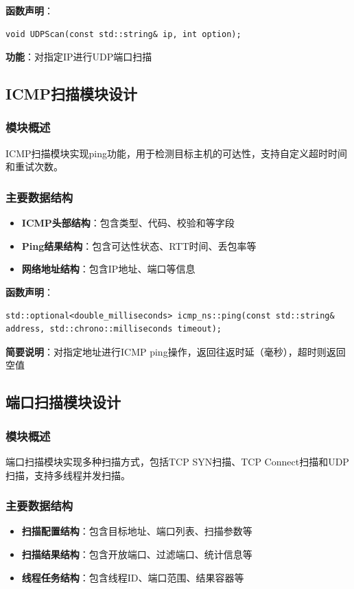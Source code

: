 \documentclass[12pt,hyperref,a4paper,UTF8]{ctexart}
\begin{document}
\textbf{函数声明}：
\begin{verbatim}
void UDPScan(const std::string& ip, int option);
\end{verbatim}
\textbf{功能}：对指定IP进行UDP端口扫描

\subsection{ICMP扫描模块设计}

\subsubsection{模块概述}
ICMP扫描模块实现ping功能，用于检测目标主机的可达性，支持自定义超时时间和重试次数。

\subsubsection{主要数据结构}
\begin{itemize}
    \item \textbf{ICMP头部结构}：包含类型、代码、校验和等字段
    \item \textbf{Ping结果结构}：包含可达性状态、RTT时间、丢包率等
    \item \textbf{网络地址结构}：包含IP地址、端口等信息
\end{itemize}


\textbf{函数声明}：
\begin{verbatim}
std::optional<double_milliseconds> icmp_ns::ping(const std::string& address, std::chrono::milliseconds timeout);
\end{verbatim}
\textbf{简要说明}：对指定地址进行ICMP ping操作，返回往返时延（毫秒），超时则返回空值

\subsection{端口扫描模块设计}

\subsubsection{模块概述}
端口扫描模块实现多种扫描方式，包括TCP SYN扫描、TCP Connect扫描和UDP扫描，支持多线程并发扫描。

\subsubsection{主要数据结构}
\begin{itemize}
    \item \textbf{扫描配置结构}：包含目标地址、端口列表、扫描参数等
    \item \textbf{扫描结果结构}：包含开放端口、过滤端口、统计信息等
    \item \textbf{线程任务结构}：包含线程ID、端口范围、结果容器等
\end{itemize}
\end{document}

